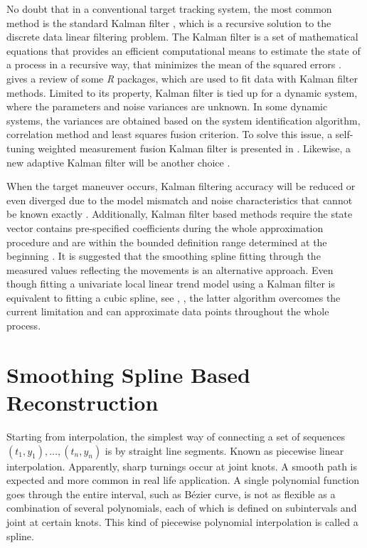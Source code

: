 No doubt that in a conventional target tracking system, the most common method is the standard Kalman filter \cite{kalman1960new}, which is a recursive solution to the discrete data linear filtering problem. The Kalman filter is a set of mathematical equations that provides an efficient computational means to estimate the state of a process in a recursive way, that minimizes the mean of the squared errors \cite{bishop2001introduction}. \cite{tusell2011kalman} gives a review of some \textit{R} packages, which are used to fit data with Kalman filter methods. Limited to its property, Kalman filter is tied up for a dynamic system, where the parameters and noise variances are unknown. In some dynamic systems, the variances are obtained based on the system identification algorithm, correlation method and least squares fusion criterion. To solve this issue, a self-tuning weighted measurement fusion Kalman filter is presented in \cite{ran2010self}. Likewise, a new adaptive Kalman filter will be another choice \cite{oussalah2001adaptive}. 

When the target maneuver occurs, Kalman filtering accuracy will be reduced or even diverged due to the model mismatch and noise characteristics that cannot be known exactly \cite{liu2014filtering}. Additionally, Kalman filter based methods require the state vector contains pre-specified coefficients during the whole approximation procedure and are within the bounded definition range determined at the beginning \cite{jauch2017recursive}. It is suggested that the smoothing spline fitting through the measured values reflecting the movements is an alternative approach. Even though fitting a univariate local linear trend model using a Kalman filter is equivalent to fitting a cubic spline, see \cite{eubank2004simple}, \cite{durbin2012time}, the latter algorithm overcomes the current limitation and can approximate data points throughout the whole process. 



\section{Smoothing Spline Based Reconstruction}

Starting from interpolation, the simplest way of connecting a set of sequences $(t_1,y_1),\ldots, (t_n,y_n)$ is by straight line segments. Known as piecewise
linear interpolation. Apparently, sharp turnings occur at joint knots. A smooth path is expected and more common in real life application. A single polynomial function goes through the entire interval, such as B\'ezier curve, is not as flexible as a combination of several polynomials, each of which is defined on subintervals and joint at certain knots. This kind of piecewise polynomial interpolation is called a spline. 

